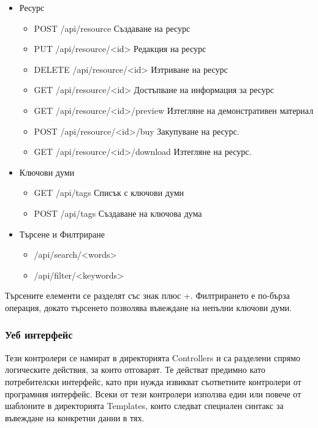 \begin{itemize}
    \item{Ресурс}
    \begin{itemize}
        \item POST /api/resource
            Създаване на ресурс
        \item PUT /api/resource/<id>
            Редакция на ресурс
        \item DELETE /api/resource/<id>
            Изтриване на ресурс
        \item GET /api/resource/<id>
            Достъпване на информация за ресурс
        \item GET /api/resource/<id>/preview
            Изтегляне на демонстративен материал
        \item POST /api/resource/<id>/buy
            Закупуване на ресурс.
        \item GET /api/resource/<id>/download
            Изтегляне на ресурс.
    \end{itemize}

    \item{Ключови думи}
    \begin{itemize}
        \item GET /api/tags
            Списък с ключови думи
        \item POST /api/tags
            Създаване на ключова дума
    \end{itemize}

    \item{Търсене и Филтриране}
    \begin{itemize}
        \item /api/search/<words>
        \item /api/filter/<keywords>
    \end{itemize}
\end{itemize}

Търсените елементи се разделят със знак плюс +.
Филтрирането е по-бърза операция, докато търсенето
позволява въвеждане на непълни ключови думи.

\subsubsection{Уеб интерфейс}
Тези контролери се намират в директорията Controllers
и са разделени спрямо логическите действия, за които
отговарят. Те действат предимно като потребителски
интерфейс, като при нужда извикват съответните контролери
от програмния интерфейс.
Всеки от тези контролери използва един или повече от
шаблоните в директорията Templates, които следват
специален синтакс за въвеждане на конкретни данни в тях.


